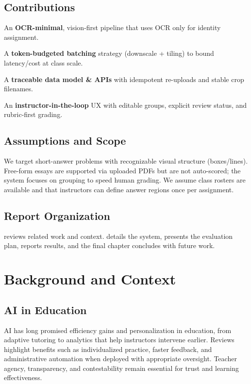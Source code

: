 \documentclass[ms,twoside,print]{nuthesis}
\begin{document}
\section{Contributions}
\begin{compactitem}
  \item An \textbf{OCR-minimal}, vision-first pipeline that uses OCR only for identity assignment.
  \item A \textbf{token-budgeted batching} strategy (downscale + tiling) to bound latency/cost at class scale.
  \item A \textbf{traceable data model \& APIs} with idempotent re-uploads and stable crop filenames.
  \item An \textbf{instructor-in-the-loop} UX with editable groups, explicit review status, and rubric-first grading.
\end{compactitem}

\section{Assumptions and Scope}
We target short-answer problems with recognizable visual structure (boxes/lines). Free-form essays are supported via uploaded PDFs but are not auto-scored; the system focuses on grouping to speed human grading. We assume class rosters are available and that instructors can define answer regions once per assignment.

\section{Report Organization}
 reviews related work and context.  details the system,  presents the evaluation plan,  reports results, and the final chapter concludes with future work.

\chapter{Background and Context}\label{chap:bg}
\section{AI in Education}
AI has long promised efficiency gains and personalization in education, from adaptive tutoring to analytics that help instructors intervene earlier. Reviews highlight benefits such as individualized practice, faster feedback, and administrative automation when deployed with appropriate oversight\cite{Alto2023,Chen2020,Luckin2016,Zawacki2019}. Teacher agency, transparency, and contestability remain essential for trust and learning effectiveness.
\end{document}
